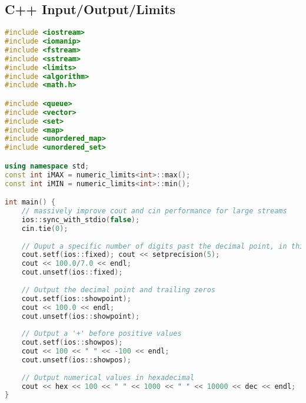 \subsection{C++ Input/Output/Limits}
\begin{lstlisting}[language=C++]
#include <iostream>
#include <iomanip>
#include <fstream>
#include <sstream>
#include <limits>
#include <algorithm>
#include <math.h>

#include <queue>
#include <vector>
#include <set>
#include <map>
#include <unordered_map>
#include <unordered_set>

using namespace std;
const int iMAX = numeric_limits<int>::max();
const int iMIN = numeric_limits<int>::min();

int main() {
	// massively improve cout and cin performance for large streams
	ios::sync_with_stdio(false);
	cin.tie(0);
	
	// Ouput a specific number of digits past the decimal point, in this case 5    
	cout.setf(ios::fixed); cout << setprecision(5);
	cout << 100.0/7.0 << endl;
	cout.unsetf(ios::fixed);
    
	// Output the decimal point and trailing zeros
	cout.setf(ios::showpoint);
	cout << 100.0 << endl;
	cout.unsetf(ios::showpoint);
    
	// Output a '+' before positive values
	cout.setf(ios::showpos);
	cout << 100 << " " << -100 << endl;
	cout.unsetf(ios::showpos);
    
	// Output numerical values in hexadecimal
	cout << hex << 100 << " " << 1000 << " " << 10000 << dec << endl;
}
\end{lstlisting}